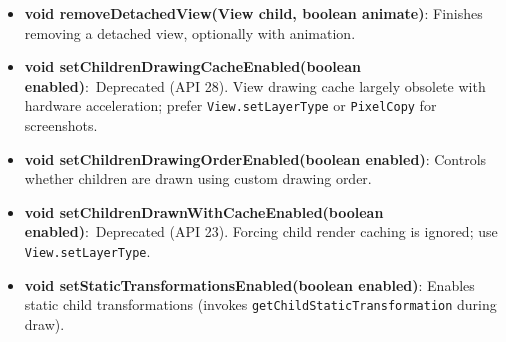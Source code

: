 \documentclass{report}
\begin{document}
\begin{itemize}
\begin{itemize}
                \item \textbf{void removeDetachedView(View child, boolean animate)}: Finishes removing a detached view, optionally with animation.
                \item \textbf{void setChildrenDrawingCacheEnabled(boolean enabled)}:\footnotesize~Deprecated (API 28). View drawing cache largely obsolete with hardware acceleration; prefer \texttt{View.setLayerType} or \texttt{PixelCopy} for screenshots. \normalsize
                \item \textbf{void setChildrenDrawingOrderEnabled(boolean enabled)}: Controls whether children are drawn using custom drawing order.
                \item \textbf{void setChildrenDrawnWithCacheEnabled(boolean enabled)}:\footnotesize~Deprecated (API 23). Forcing child render caching is ignored; use \texttt{View.setLayerType}. \normalsize
                \item \textbf{void setStaticTransformationsEnabled(boolean enabled)}: Enables static child transformations (invokes \texttt{getChildStaticTransformation} during draw).
            \end{itemize}


\end{itemize}
\end{document}
